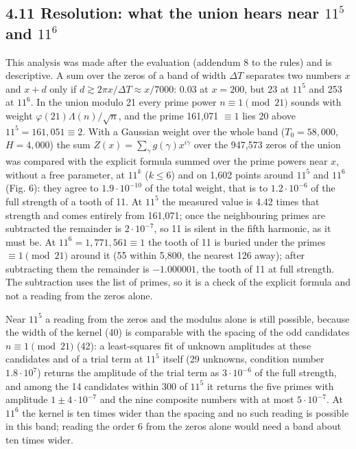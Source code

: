 \documentclass[
  10pt,
]{article}
\begin{document}
\hypertarget{resolution-what-the-union-hears-near-115-and-116}{%
\subsection{\texorpdfstring{4.11 Resolution: what the union hears near
\(11^5\) and
\(11^6\)}{4.11 Resolution: what the union hears near 11\^{}5 and 11\^{}6}}\label{resolution-what-the-union-hears-near-115-and-116}}

This analysis was made after the evaluation (addendum 8 to the rules)
and is descriptive. A sum over the zeros of a band of width \(\Delta T\)
separates two numbers \(x\) and \(x + d\) only if
\(d \gtrsim 2\pi x/\Delta T \approx x/7000\): 0.03 at \(x = 200\), but
23 at \(11^5\) and 253 at \(11^6\). In the union modulo 21 every prime
power \(n \equiv 1 \pmod{21}\) sounds with weight
\(\varphi(21)\Lambda(n)/\sqrt n\), and the prime 161,071 \(\equiv 1\)
lies 20 above \(11^5 = 161{,}051 \equiv 2\). With a Gaussian weight over
the whole band (\(T_0 = 58{,}000\), \(H = 4{,}000\)) the sum
\(Z(x) = \sum_\gamma g(\gamma)x^{i\gamma}\) over the 947,573 zeros of
the union was compared with the explicit formula summed over the prime
powers near \(x\), without a free parameter, at \(11^k\) (\(k \le 6\))
and on 1,602 points around \(11^5\) and \(11^6\) (Fig. 6): they agree to
\(1.9\cdot10^{-10}\) of the total weight, that is to \(1.2\cdot10^{-6}\)
of the full strength of a tooth of 11. At \(11^5\) the measured value is
4.42 times that strength and comes entirely from 161,071; once the
neighbouring primes are subtracted the remainder is \(2\cdot10^{-7}\),
so 11 is silent in the fifth harmonic, as it must be. At
\(11^6 = 1{,}771{,}561 \equiv 1\) the tooth of 11 is buried under the
primes \(\equiv 1 \pmod{21}\) around it (55 within 5,800, the nearest
126 away); after subtracting them the remainder is \(-1.000001\), the
tooth of 11 at full strength. The subtraction uses the list of primes,
so it is a check of the explicit formula and not a reading from the
zeros alone.

Near \(11^5\) a reading from the zeros and the modulus alone is still
possible, because the width of the kernel (40) is comparable with the
spacing of the odd candidates \(n \equiv 1 \pmod{21}\) (42): a
least-squares fit of unknown amplitudes at these candidates and of a
trial term at \(11^5\) itself (29 unknowns, condition number
\(1.8\cdot10^7\)) returns the amplitude of the trial term as
\(3\cdot10^{-6}\) of the full strength, and among the 14 candidates
within 300 of \(11^5\) it returns the five primes with amplitude
\(1 \pm 4\cdot10^{-7}\) and the nine composite numbers with at most
\(5\cdot10^{-7}\). At \(11^6\) the kernel is ten times wider than the
spacing and no such reading is possible in this band; reading the order
6 from the zeros alone would need a band about ten times wider.
\end{document}
